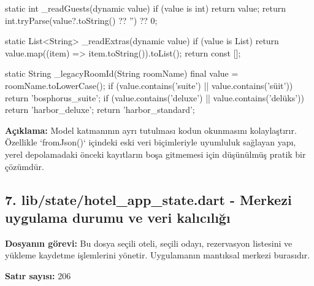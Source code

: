 \documentclass[11pt,a4paper]{article}
\begin{document}
\begin{codeblock}
{  static int _readGuests(dynamic value) {
    if (value is int) {
      return value;
    }
    return int.tryParse(value?.toString() ?? '') ?? 0;
  }

  static List<String> _readExtras(dynamic value) {
    if (value is List) {
      return value.map((item) => item.toString()).toList();
    }
    return const [];
  }

  static String _legacyRoomId(String roomName) {
    final value = roomName.toLowerCase();
    if (value.contains('suite') || value.contains('süit')) {
      return 'bosphorus_suite';
    }
    if (value.contains('deluxe') || value.contains('delüks')) {
      return 'harbor_deluxe';
    }
    return 'harbor_standard';
  }
}
\end{codeblock}

\textbf{Açıklama:} Model katmanının ayrı tutulması kodun okunmasını kolaylaştırır. Özellikle `fromJson()` içindeki eski veri biçimleriyle uyumluluk sağlayan yapı, yerel depolamadaki önceki kayıtların boşa gitmemesi için düşünülmüş pratik bir çözümdür.

\clearpage
\subsection{7. lib/state/hotel\_app\_state.dart - Merkezi uygulama durumu ve veri kalıcılığı}
\textbf{Dosyanın görevi:} Bu dosya seçili oteli, seçili odayı, rezervasyon listesini ve yükleme kaydetme işlemlerini yönetir. Uygulamanın mantıksal merkezi burasıdır.

\textbf{Satır sayısı:} 206
\end{document}

